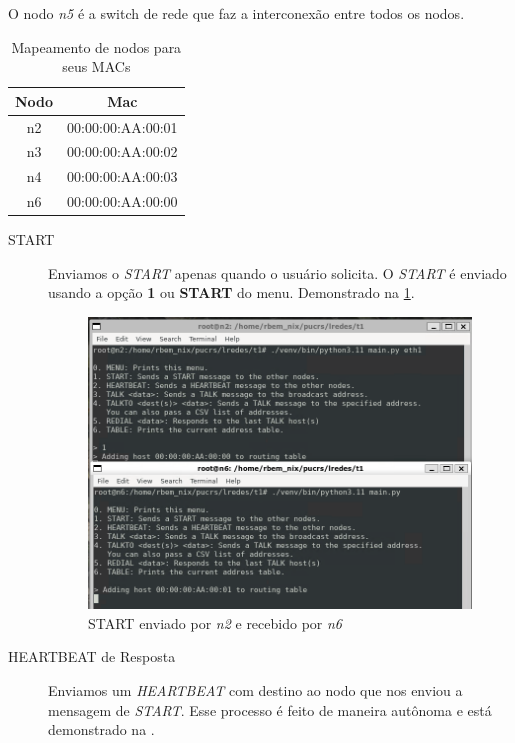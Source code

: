 O nodo \textit{n5} é a switch de rede que faz a interconexão entre todos os nodos.

\begin{table}[H]
    \centering
    \begin{tabular}{cc}
        \textbf{Nodo} & \textbf{Mac} \\\hline
        n2 & 00:00:00:AA:00:01 \\
        n3 & 00:00:00:AA:00:02 \\
        n4 & 00:00:00:AA:00:03 \\
        n6 & 00:00:00:AA:00:00
    \end{tabular}
    \caption{Mapeamento de nodos para seus MACs}
    \label{tab:mac_addrs}
\end{table}

\begin{description}
    \item[START] Enviamos o \textit{START} apenas quando o usuário solicita. O \textit{START} é enviado usando a opção \textbf{1} ou \textbf{START} do menu. Demonstrado na \figurename{ \ref{fig:start_print}}.
    \begin{figure}[H]
        \centering
        \includegraphics[width=30em]{START.png}
        \caption{START enviado por \textit{n2} e recebido por \textit{n6}}
        \label{fig:start_print}
    \end{figure}
    \item[HEARTBEAT de Resposta] Enviamos um \textit{HEARTBEAT} com destino ao nodo que nos enviou a mensagem de \textit{START}. Esse processo é feito de maneira autônoma e está demonstrado na \tableautorefname{ \ref{tab:heartbeat_start_print}}.
    \begin{table}[H]
        \centering
        \begin{tabular}{ccc}

\end{tabular}
\end{table}
\end{description}
